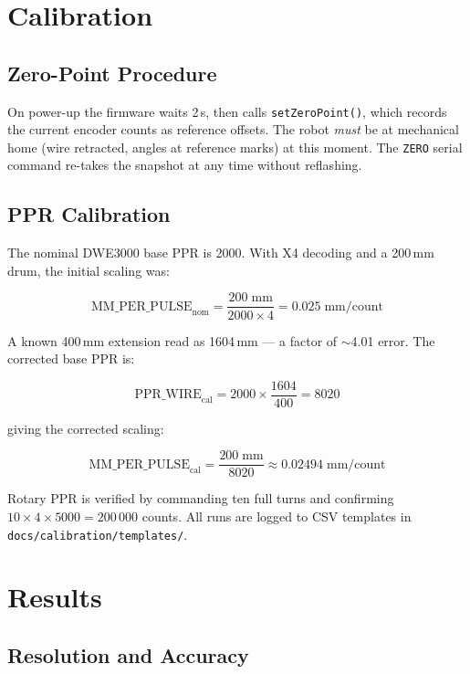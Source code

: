 \documentclass[11pt,a4paper]{article}
\begin{document}
\section{Calibration}
\label{sec:cal}

\subsection{Zero-Point Procedure}

On power-up the firmware waits 2\,s, then calls \texttt{setZeroPoint()},
which records the current encoder counts as reference offsets.  The
robot \textit{must} be at mechanical home (wire retracted, angles at
reference marks) at this moment.  The \texttt{ZERO} serial command
re-takes the snapshot at any time without reflashing.

\subsection{PPR Calibration}

The nominal DWE3000 base PPR is 2000.  With X4 decoding and a 200\,mm
drum, the initial scaling was:

\[
  \text{MM\_PER\_PULSE}_\text{nom}
    = \frac{200\;\text{mm}}{2000 \times 4}
    = 0.025\;\text{mm/count}
\]

A known 400\,mm extension read as 1604\,mm --- a factor of $\sim$4.01
error.  The corrected base PPR is:

\begin{equation}
  \text{PPR\_WIRE}_\text{cal}
    = 2000 \times \frac{1604}{400}
    = 8020
  \label{eq:ppr}
\end{equation}

giving the corrected scaling:

\[
  \text{MM\_PER\_PULSE}_\text{cal}
    = \frac{200\;\text{mm}}{8020}
    \approx 0.02494\;\text{mm/count}
\]

Rotary PPR is verified by commanding ten full turns and confirming
\(10 \times 4 \times 5000 = 200\,000\) counts.  All runs are logged to
CSV templates in \texttt{docs/calibration/templates/}.

\section{Results}
\label{sec:results}

\subsection{Resolution and Accuracy}
\end{document}
